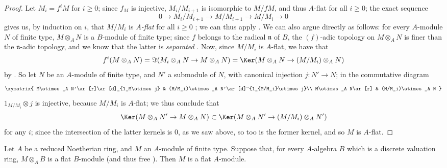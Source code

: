 \begin{proof}
Let $M_i=f^iM$ for $i\geq0$;
since $f_M$ is injective, $M_i/M_{i+1}$ is isomorphic to $M/fM$, and thus $A$-flat for all $i\geq0$;
the exact sequence
\[
  0\to M_i/M_{i+1}\to M/M_{i+1}\to M/M_i\to 0
\]
gives us, by induction on $i$, that $M/M_i$ is \emph{$A$-flat} for all $i\geq0$ ;
we can thus apply .
We can also argue directly as follows:
for every $A$-module $N$ of finite type, $M\otimes_A N$ is a $B$-module of finite type;
since $f$ belongs to the radical $\mathfrak{n}$ of $B$, the $(f)$-adic topology on $M\otimes_A N$ is finer than the
$\mathfrak{n}$-adic topology, and we know that the latter is \emph{separated} .
Now, since $M/M_i$ is $A$-flat, we have that
\[
  f^i(M\otimes_A N)=\Im(M_i\otimes_A N\to M\otimes_A N)=\Ker(M\otimes_A N\to(M/M_i)\otimes_A N)
\]
by .
So let $N$ be an $A$-module of finite type, and $N'$ a submodule of $N$, with canonical injection $j:N'\to N$; in the commutative diagram
\[
  \xymatrix{
    M\otimes_A N'\ar[r]\ar[d]_{1_M\otimes j} &
    (M/M_i)\otimes_A N'\ar[d]^{1_{M/M_i}\otimes j}\\
    M\otimes_A N\ar[r] &
    (M/M_i)\otimes_A N
  }
\]
$1_{M/M_i}\otimes j$ is injective, because $M/M_i$ is $A$-flat; we thus conclude that
\[
  \Ker(M\otimes_A N'\to M\otimes_A N)\subset\Ker(M\otimes_A N'\to(M/M_i)\otimes_A N')
\]
for any $i$; since the intersection of the latter kernels is $0$, as we saw above, so too is the former kernel, and so $M$ is $A$-flat.
\end{proof}

\begin{proposition}[10.2.8]
\label{0.10.2.8}
Let $A$ be a reduced Noetherian ring, and $M$ an $A$-module of finite type.
Suppose that, for every $A$-algebra $B$ which is a discrete valuation ring, $M\otimes_A B$ is a flat $B$-module (and thus free ).
Then $M$ is a flat $A$-module.
\end{proposition}

